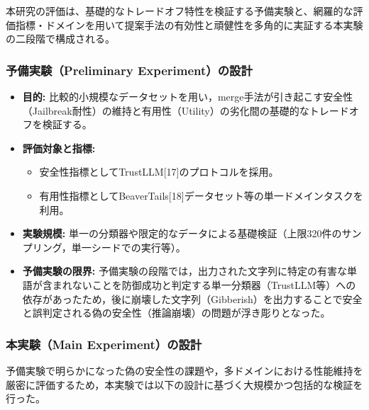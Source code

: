 本研究の評価は、基礎的なトレードオフ特性を検証する予備実験と、網羅的な評価指標・ドメインを用いて提案手法の有効性と頑健性を多角的に実証する本実験の二段階で構成される。

\subsubsection{予備実験（Preliminary Experiment）の設計}

\begin{itemize}
    \item \textbf{目的:}
    比較的小規模なデータセットを用い，merge手法が引き起こす安全性（Jailbreak耐性）の維持と有用性（Utility）の劣化間の基礎的なトレードオフを検証する。
    \item \textbf{評価対象と指標:}
    \begin{itemize}
        \item 安全性指標としてTrustLLM[17]のプロトコルを採用。
        \item 有用性指標としてBeaverTails[18]データセット等の単一ドメインタスクを利用。
    \end{itemize}
    \item \textbf{実験規模:}
    単一の分類器や限定的なデータによる基礎検証（上限320件のサンプリング，単一シードでの実行等）。
    \item \textbf{予備実験の限界:}
    予備実験の段階では，出力された文字列に特定の有害な単語が含まれないことを防御成功と判定する単一分類器（TrustLLM等）への依存があったため，後に崩壊した文字列（Gibberish）を出力することで安全と誤判定される偽の安全性（推論崩壊）の問題が浮き彫りとなった。
\end{itemize}

\subsubsection{本実験（Main Experiment）の設計}
予備実験で明らかになった偽の安全性の課題や，多ドメインにおける性能維持を厳密に評価するため，本実験では以下の設計に基づく大規模かつ包括的な検証を行った。

